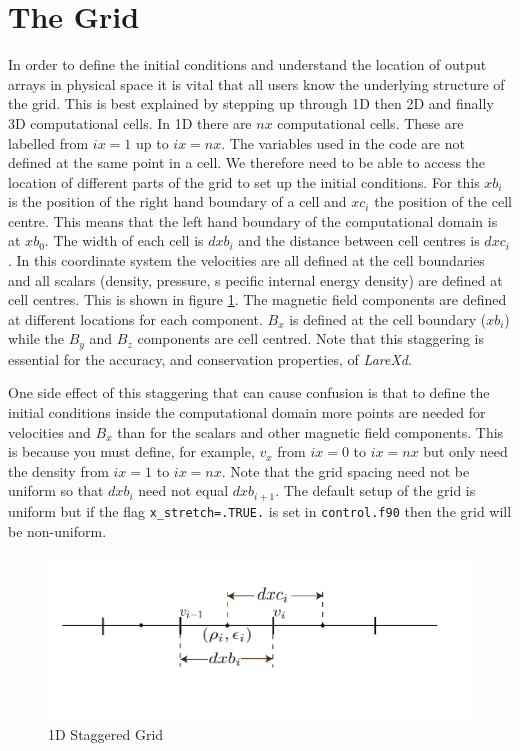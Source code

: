 \documentclass[11pt]{article}
\begin{document}
\section{The Grid}
In order to define the initial conditions and understand the location of output arrays in physical space it is vital 
that all users know the underlying structure of the grid. This is best explained by stepping up through 1D then 2D and 
finally 3D computational cells. In 1D there are $nx$ computational cells. These are labelled from $ix=1$ up to $ix=nx$. 
The variables used in the code are not defined at the same point in a cell. We therefore need to be able to access the 
location of different parts of the grid to set up the initial conditions. For this $xb_i$ is the position of the right 
hand boundary of a cell and $xc_i$ the position of the cell centre. This means that the left hand boundary of the 
computational domain is at $xb_0$. The width of each cell is $dxb_i$ and the distance between cell centres is $dxc_i$. 
In this coordinate system the velocities are all defined at the cell boundaries and all scalars (density, pressure, s
pecific internal energy density) are defined at cell centres. This is shown in figure \ref{1d-staggered}. The magnetic 
field components are defined at different locations for each component. $B_x$ is defined at the cell boundary ($xb_i$) 
while the $B_y$ and $B_z$ components are cell centred. Note that this staggering is essential for the accuracy, and 
conservation properties, of {\it LareXd}.

One side effect of this staggering that can cause confusion is that to define the initial conditions inside the 
computational domain more points are needed for velocities and $B_x$ than for the scalars and other magnetic field 
components. This is because you must define, for example, $v_x$ from $ix=0$ to $ix=nx$ but only need the density 
from $ix=1$ to $ix=nx$. Note that the grid spacing need not be uniform so that $dxb_i$ need not equal $dxb_{i+1}$. 
The default setup of the grid is uniform but if the flag \texttt{x\_stretch=.TRUE.} is set in \texttt{control.f90} 
then the grid will be non-uniform.


\begin{figure}
\begin{center}
  \includegraphics{1d-staggered-grid.pdf}
\caption{1D Staggered Grid}
\end{center}
\label{1d-staggered}
\end{figure}
\end{document}
